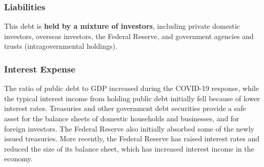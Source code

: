 \subsubsection*{Liabilities}
\begin{minipage}{0.76\textwidth}   
\small  This debt is \textbf{held by a mixture of investors}, including private domestic investors, overseas investors, the Federal Reserve, and government agencies and trusts (intragovernmental holdings). 


\vspace{1mm}

\vspace{4.1cm}

\hspace{5mm} 

\vspace{3mm}

\subsubsection*{Interest Expense}
\small The ratio of public debt to GDP increased during the COVID-19 response, while the typical interest income from holding public debt initially fell because of lower interest rates. Treasuries and other government debt securities provide a safe asset for the balance sheets of domestic households and businesses, and for foreign investors. The Federal Reserve also initially absorbed some of the newly issued treasuries. More recently, the Federal Reserve has raised interest rates and reduced the size of its balance sheet, which has increased interest income in the economy. 
\end{minipage}
\vspace{1mm}


